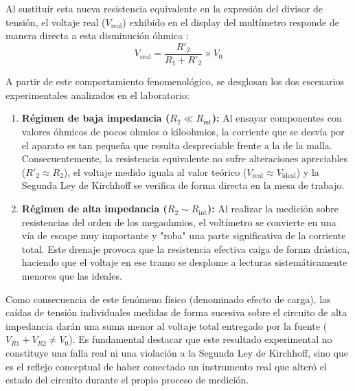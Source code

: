 Al sustituir esta nueva resistencia equivalente en la expresión del divisor de tensión, el voltaje real ($V_{\text{real}}$) exhibido en el display del multímetro responde de manera directa a esta disminución óhmica \cite{560}:
\begin{equation}
    V_{\text{real}} = \frac{R'_2}{R_1 + R'_2} \times V_0
\end{equation}

A partir de este comportamiento fenomenológico, se desglosan los dos escenarios experimentales analizados en el laboratorio:

\begin{enumerate}
    \item \textbf{Régimen de baja impedancia ($R_2 \ll R_{\text{int}}$):} Al ensayar componentes con valores óhmicos de pocos ohmios o kiloohmios, la corriente que se desvía por el aparato es tan pequeña que resulta despreciable frente a la de la malla. Consecuentemente, la resistencia equivalente no sufre alteraciones apreciables ($R'_2 \approx R_2$), el voltaje medido iguala al valor teórico ($V_{\text{real}} \approx V_{\text{ideal}}$) y la Segunda Ley de Kirchhoff se verifica de forma directa en la mesa de trabajo.
    
    \item \textbf{Régimen de alta impedancia ($R_2 \sim R_{\text{int}}$):} Al realizar la medición sobre resistencias del orden de los megaohmios, el voltímetro se convierte en una vía de escape muy importante y "roba" una parte significativa de la corriente total. Este drenaje provoca que la resistencia efectiva caiga de forma drástica, haciendo que el voltaje en ese tramo se desplome a lecturas sistemáticamente menores que las ideales. 
\end{enumerate}

Como consecuencia de este fenómeno físico (denominado efecto de carga), las caídas de tensión individuales medidas de forma sucesiva sobre el circuito de alta impedancia darán una suma menor al voltaje total entregado por la fuente ($V_{R1} + V_{R2} \neq V_0$). Es fundamental destacar que este resultado experimental no constituye una falla real ni una violación a la Segunda Ley de Kirchhoff, sino que es el reflejo conceptual de haber conectado un instrumento real que alteró el estado del circuito durante el propio proceso de medición.
\clearpage
